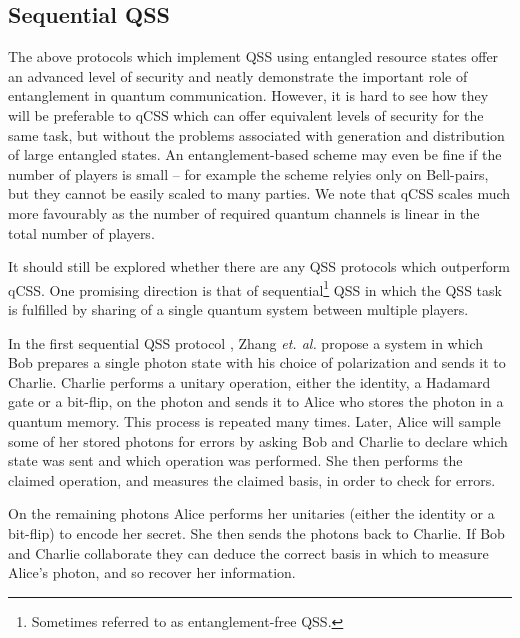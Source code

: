 


\subsection{Sequential QSS}
The above protocols which implement QSS using entangled resource states offer an advanced level of security and neatly demonstrate the important role of entanglement in quantum communication. However, it is hard to see how they will be preferable to qCSS which can offer equivalent levels of security for the same task, but without the problems associated with generation and distribution of large entangled states. An entanglement-based scheme may even be fine if the number of players is small -- for example the scheme \cite{Karlsson1999} relyies only on Bell-pairs, but they cannot be easily scaled to many parties. We note that qCSS scales much more favourably as the number of required quantum channels is linear in the total number of players.

It should still be explored whether there are any QSS protocols which outperform qCSS. One promising direction is that of sequential\footnote{Sometimes referred to as entanglement-free QSS.} QSS in which the QSS task is fulfilled by sharing of a single quantum system between multiple players.

In the first sequential QSS protocol \cite{Zhang2005}, Zhang \emph{et. al.} propose a system in which Bob prepares a single photon state with his choice of polarization and sends it to Charlie. Charlie performs a unitary operation, either the identity, a Hadamard gate or a bit-flip, on the photon and sends it to Alice who stores the photon in a quantum memory. This process is repeated many times. Later, Alice will sample some of her stored photons for errors by asking Bob and Charlie to declare which state was sent and which operation was performed. She then performs the claimed operation, and measures the claimed basis, in order to check for errors.

On the remaining photons Alice performs her unitaries (either the identity or a bit-flip) to encode her secret. She then sends the photons back to Charlie. %
If Bob and Charlie collaborate they can deduce the correct basis in which to measure Alice's photon, and so recover her information.



